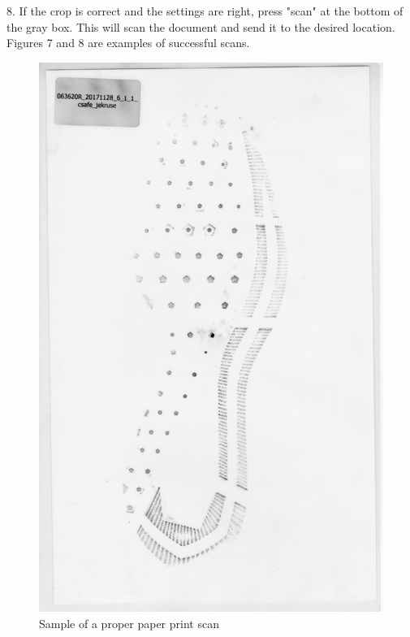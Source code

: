 \newpage

8. If the crop is correct and the settings are right, press "scan" at the bottom of the gray box. This will scan the document and send it to the desired location. Figures 7 and 8 are examples of successful scans. 

\newpage

\begin{figure}[!htp]
\centering
\includegraphics[scale=0.2]{Baseline_Paper_1}
\caption{Sample of a proper paper print scan}
\label{Image 7}
\end{figure}

